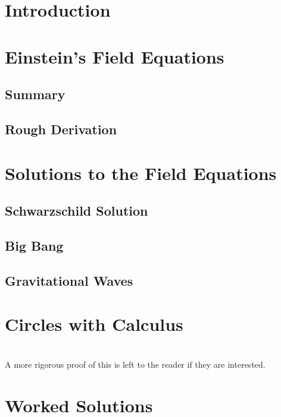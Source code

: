 \documentclass{memoir}
\begin{document}
\chapter{Introduction}
\chapter{Einstein's Field Equations}
\section{Summary}
\section{Rough Derivation}
\chapter{Solutions to the Field Equations}
\section{Schwarzschild Solution}
\section{Big Bang}
\section{Gravitational Waves}





\begin{appendices}
\chapter{Circles with Calculus}
 \\
A more rigorous proof of this is left to the reader if they are interested.
\chapter{Worked Solutions}

\end{appendices}
\end{document}
